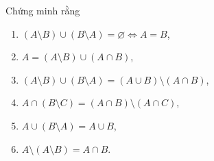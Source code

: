 \begin{exercise}Chứng minh rằng
    \begin{enumerate}[itemsep=0pt,label = (\alph*)]
        \item $(A\setminus B) \cup (B\setminus A) = \varnothing \Longleftrightarrow A = B$,
        \item $A = (A\setminus B)\cup (A\cap B)$,
        \item $(A\setminus B) \cup (B\setminus A) = (A\cup B)\setminus (A\cap B)$,
        \item $A\cap (B\setminus C) = (A\cap B) \setminus (A\cap C)$,
        \item $A\cup (B\setminus A) = A\cup B$,
        \item $A\setminus (A\setminus B) = A\cap B$.
    \end{enumerate}
\end{exercise}

